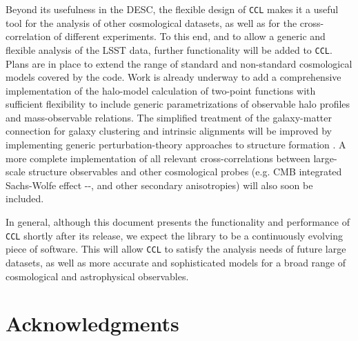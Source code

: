 \documentclass[\docopts]{\docclass}
\newcommand{\ccl}{{\tt CCL}\xspace}
\begin{document}
Beyond its usefulness in the DESC, the flexible design of \ccl makes it a useful tool for the analysis of other cosmological datasets, as well as for the cross-correlation of different experiments. To this end, and to allow a generic and flexible analysis of the LSST data, further functionality will be added to \ccl. Plans are in place to extend the range of standard and non-standard cosmological models covered by the code. Work is already underway to add a comprehensive implementation of the halo-model calculation of two-point functions \citep{Peacock2000} with sufficient flexibility to include generic parametrizations of observable halo profiles and mass-observable relations. The simplified treatment of the galaxy-matter connection for galaxy clustering and intrinsic alignments will be improved by implementing generic perturbation-theory approaches to structure formation \citep{2009JCAP...08..020M,FASTPT}. A more complete implementation of all relevant cross-correlations between large-scale structure observables and other cosmological probes (e.g. CMB integrated Sachs-Wolfe effect -\citealt{1967ApJ...147...73S}-, and other secondary anisotropies) will also soon be included. 

In general, although this document presents the functionality and performance of \ccl shortly after its release, we expect the library to be a continuously evolving piece of software. This will allow \ccl to satisfy the analysis needs of future large datasets, as well as more accurate and sophisticated models for a broad range of cosmological and astrophysical observables.

\section*{Acknowledgments}

\vskip 5pt


\vskip 5pt



\end{document}
